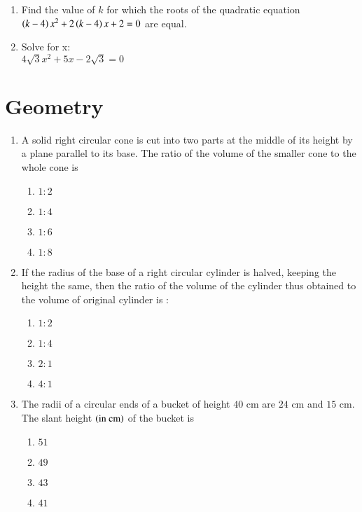 \documentclass[journal,12pt,onecolumn]{IEEEtran}
\theoremstyle{remark}
\begin{document}
\begin{enumerate}
\item Find the value of $k$ for which the roots of the quadratic equation $\left(k - 4\right) x^2 + 2\left(k-4\right) x + 2 =0$ are equal.\\
\item Solve for x:\\
$4\sqrt 3 x^2 + 5x - 2\sqrt 3 = 0$\\
\end{enumerate}
\section{Geometry}
\begin{enumerate}
\item A solid right circular cone is cut into two parts at the middle of its height by a plane parallel to its base. The ratio of the volume of the smaller cone to the whole cone is\\
\begin{enumerate}
\item $1 : 2$\\
\item $1 : 4$\\
\item $1 : 6$\\
\item $1 : 8$\\
\end{enumerate}
\item If the radius of the base of a right circular cylinder is halved, keeping the height the same, then the ratio of the volume of the cylinder thus obtained to the volume of original cylinder is :\\
\begin{enumerate}
\item $1 : 2$\\
\item $1 : 4$\\
\item $2 : 1$\\
\item $4 : 1$\\
\end{enumerate}
\item The radii of a circular ends of a bucket of height $40\text{ cm}$ are $24\text{ cm}$ and $15\text{ cm}$. The slant height $\left(\text{in cm}\right)$ of the bucket is\\
\begin{enumerate}
\item $51$\\
\item $49$\\
\item $43$\\
\item $41$\\
\end{enumerate}


\end{enumerate}
\end{document}
